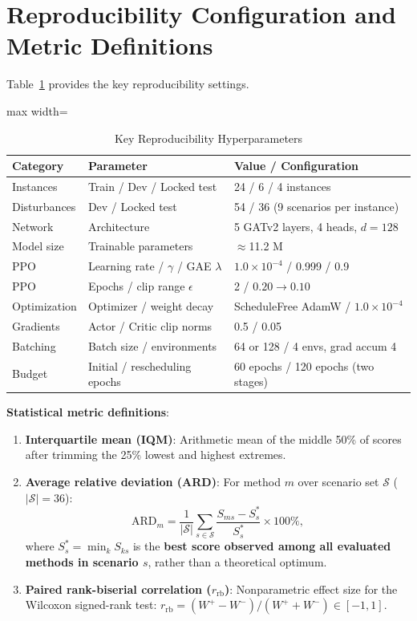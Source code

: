 \documentclass[journal,10pt]{IEEEtran}
\renewcommand{\arraystretch}{1.06}
\begin{document}
\section{Reproducibility Configuration and Metric Definitions}\label{app:reproducibility}

Table~\ref{tab:reproducibility} provides the key reproducibility settings.

\begin{table}[!t]
\centering
\caption{Key Reproducibility Hyperparameters}
\label{tab:reproducibility}
\setlength{\tabcolsep}{3pt}
\renewcommand{\arraystretch}{1.04}
\begin{adjustbox}{max width=\columnwidth}
\begin{tabular}{@{}llp{4.2cm}@{}}
\toprule
\textbf{Category} & \textbf{Parameter} & \textbf{Value / Configuration} \\
\midrule
Instances & Train / Dev / Locked test & 24 / 6 / 4 instances \\
Disturbances & Dev / Locked test & 54 / 36 (9 scenarios per instance) \\
Network & Architecture & 5 GATv2 layers, 4 heads, $d=128$ \\
Model size & Trainable parameters & $\approx$11.2 M \\
PPO & Learning rate / $\gamma$ / GAE $\lambda$ & $1.0\times10^{-4}$ / 0.999 / 0.9 \\
PPO & Epochs / clip range $\epsilon$ & 2 / $0.20\to0.10$ \\
Optimization & Optimizer / weight decay & ScheduleFree AdamW / $1.0\times10^{-4}$ \\
Gradients & Actor / Critic clip norms & 0.5 / 0.05 \\
Batching & Batch size / environments & 64 or 128 / 4 envs, grad accum 4 \\
Budget & Initial / rescheduling epochs & 60 epochs / 120 epochs (two stages) \\
\bottomrule
\end{tabular}
\end{adjustbox}
\end{table}

\textbf{Statistical metric definitions}:
\begin{enumerate}
\item \textbf{Interquartile mean (IQM)}: Arithmetic mean of the middle 50\% of scores after trimming the 25\% lowest and highest extremes.
\item \textbf{Average relative deviation (ARD)}: For method $m$ over scenario set $\mathcal S$ ($|\mathcal S|=36$):
\begin{equation}
\mathrm{ARD}_m = \frac{1}{|\mathcal S|}\sum_{s\in\mathcal S} \frac{S_{ms}-S_s^*}{S_s^*}\times100\%,
\end{equation}
where $S_s^*=\min_k S_{ks}$ is the \textbf{best score observed among all evaluated methods in scenario $s$}, rather than a theoretical optimum.
\item \textbf{Paired rank-biserial correlation ($r_{\mathrm{rb}}$)}: Nonparametric effect size for the Wilcoxon signed-rank test: $r_{\mathrm{rb}}=(W^+-W^-)/(W^++W^-)\in[-1,1]$.
\end{enumerate}
\end{document}

